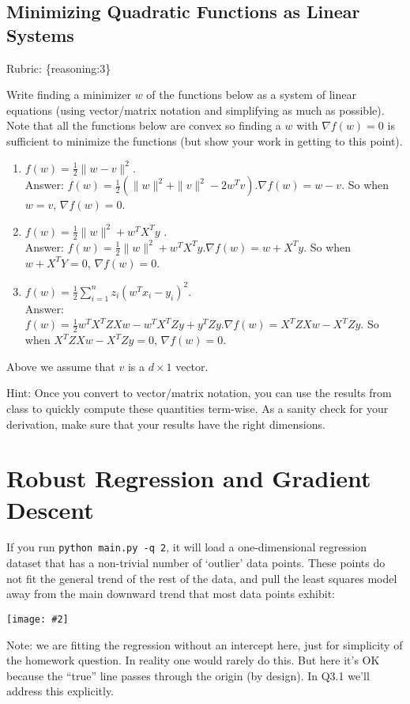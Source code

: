 \documentclass{article}
\def\rubric#1{\gre{Rubric: \{#1\}}}{}
\def\blu#1{{\color{blu}#1}}
\def\gre#1{{\color{gre}#1}}
\def\norm#1{\|#1\|}
\newcommand{\centerfig}[2]{\begin{center}\texttt{[image: \#2]}\end{center}}
\def\enum#1{\begin{enumerate}#1\end{enumerate}}
\begin{document}
\newpage
\subsection{Minimizing Quadratic Functions as Linear Systems}
\rubric{reasoning:3}

Write finding a minimizer $w$ of the functions below as a system of linear equations (using vector/matrix notation and simplifying as much as possible). Note that all the functions below are convex  so finding a $w$ with $\nabla f(w) = 0$ is sufficient to minimize the functions (but show your work in getting to this point).
\blu{\enum{
\item $f(w) = \frac{1}{2}\norm{w-v}^2$.
\textcolor{gre}{\\Answer: $f(w) = \frac{1}{2}(\norm{w}^2+\norm{v}^2-2w^Tv).\nabla f(w)=w-v.$ So when $w=v$, $\nabla f(w)=0.$}
\item $f(w) = \frac{1}{2}\norm{w}^2 + w^TX^Ty$ .
\textcolor{gre}{\\Answer: $f(w) = \frac{1}{2} \norm{w}^2+w^TX^Ty. \nabla f(w)=w+X^Ty.$ So when $w+X^TY=0$, $\nabla f(w)=0.$}
\item $f(w) = \frac{1}{2}\sum_{i=1}^n z_i (w^Tx_i - y_i)^2$.
\textcolor{gre}{\\Answer: $f(w)=\frac{1}{2}w^TX^TZXw-w^TX^TZy+y^TZy. \nabla f(w)=X^TZXw-X^TZy.$ So when $X^TZXw-X^TZy=0$, $\nabla f(w)=0.$}
}}
Above we assume that $v$ is a $d \times 1$ vector.

Hint: Once you convert to vector/matrix notation, you can use the results from class to quickly compute these quantities term-wise.
As a sanity check for your derivation, make sure that your results have the right dimensions.

\newpage
\section{Robust Regression and Gradient Descent}

If you run \verb|python main.py -q 2|, it will load a one-dimensional regression
dataset that has a non-trivial number of `outlier' data points.
These points do not fit the general trend of the rest of the data,
and pull the least squares model away from the main downward trend that most data points exhibit:

\centerfig{.7}{/Users/rachelsunderland/Desktop/a3_figs/figs/least_squares_outliers.pdf}


Note: we are fitting the regression without an intercept here, just for simplicity of the homework question.
In reality one would rarely do this. But here it's OK because the ``true'' line
passes through the origin (by design). In Q3.1 we'll address this explicitly.
\end{document}
